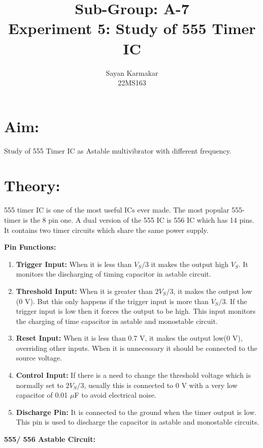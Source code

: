 \documentclass[12pt]{article}
\begin{document}
	\title{Sub-Group: A-7 \\ Experiment 5: Study of 555 Timer IC}
	
	
	\author{Sayan Karmakar \\22MS163 }
	\date{}
	\maketitle

\section{Aim:}
Study of 555 Timer IC as Astable multivibrator with different frequency.
\section{Theory:}
555 timer IC is one of the most useful ICs ever made. The most popular 555-timer is the 8 pin one. A dual version of the 555 IC is 556 IC which has 14 pins. It contains two timer circuits which share the same power supply.

\vspace{1em}\noindent\textbf{Pin Functions: }
\begin{enumerate}
	\item \textbf{Trigger Input:} When it is less than $V_S/3$ it makes the output high $V_S$. It monitors the discharging of timing capacitor in astable circuit.
	\item \textbf{Threshold Input:} When it is greater than $2 V_S/ 3$, it makes the output low (0 V). But this only happens if the trigger input is more than $V_S/ 3$. If the trigger input is low then it forces the output to be high. This input monitors the charging of time capacitor in astable and monostable circuit.
	\item \textbf{Reset Input:} When it is less than 0.7 V, it makes the output low(0 V), overriding other inputs. When it is unnecessary it should be connected to the source voltage.
	\item \textbf{Control Input:} If there is a need to change the threshold voltage which is normally set to $2 V_S/3$,	usually this is connected to 0 V with a very low capacitor of 0.01 $\mu$F to avoid electrical noise.
	\item \textbf{Discharge Pin: } It is connected to the ground when the timer output is low. This pin is used to discharge the capacitor in astable and monostable circuits.
\end{enumerate}
\newpage
\vspace{1em}\noindent
\textbf{555/ 556 Astable Circuit:}
\end{document}
